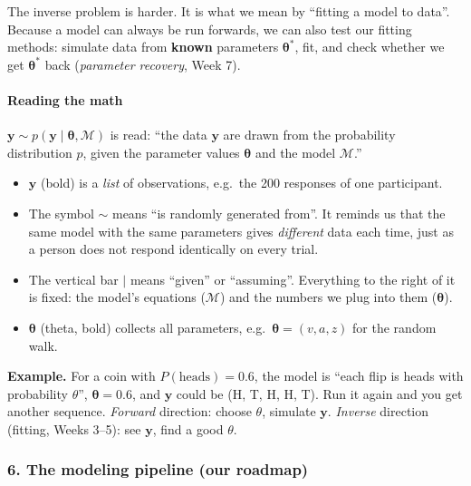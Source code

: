 The inverse problem is harder. It is what we mean by ``fitting a model
to data''. Because a model can always be run forwards, we can also test
our fitting methods: simulate data from \textbf{known} parameters
\(\boldsymbol\theta^\ast\), fit, and check whether we get
\(\boldsymbol\theta^\ast\) back (\emph{parameter recovery}, Week 7).

\paragraph{Reading the math}

\(\mathbf{y} \sim p(\mathbf{y} \mid \boldsymbol{\theta}, \mathcal{M})\)
is read: ``the data \(\mathbf{y}\) are drawn from the probability
distribution \(p\), given the parameter values \(\boldsymbol\theta\) and
the model \(\mathcal{M}\).''

\begin{itemize}
\tightlist
\item
  \(\mathbf{y}\) (bold) is a \emph{list} of observations, e.g.~the 200
  responses of one participant.
\item
  The symbol \(\sim\) means ``is randomly generated from''. It reminds
  us that the same model with the same parameters gives \emph{different}
  data each time, just as a person does not respond identically on every
  trial.
\item
  The vertical bar \(\mid\) means ``given'' or ``assuming''. Everything
  to the right of it is fixed: the model's equations (\(\mathcal{M}\))
  and the numbers we plug into them (\(\boldsymbol\theta\)).
\item
  \(\boldsymbol\theta\) (theta, bold) collects all parameters,
  e.g.~\(\boldsymbol\theta = (v, a, z)\) for the random walk.
\end{itemize}

\textbf{Example.} For a coin with \(P(\text{heads}) = 0.6\), the model
is ``each flip is heads with probability \(\theta\)'',
\(\boldsymbol\theta = 0.6\), and \(\mathbf{y}\) could be (H, T, H, H,
T). Run it again and you get another sequence. \emph{Forward} direction:
choose \(\theta\), simulate \(\mathbf{y}\). \emph{Inverse} direction
(fitting, Weeks 3--5): see \(\mathbf{y}\), find a good \(\theta\).

\subsubsection{6. The modeling pipeline (our roadmap)}



